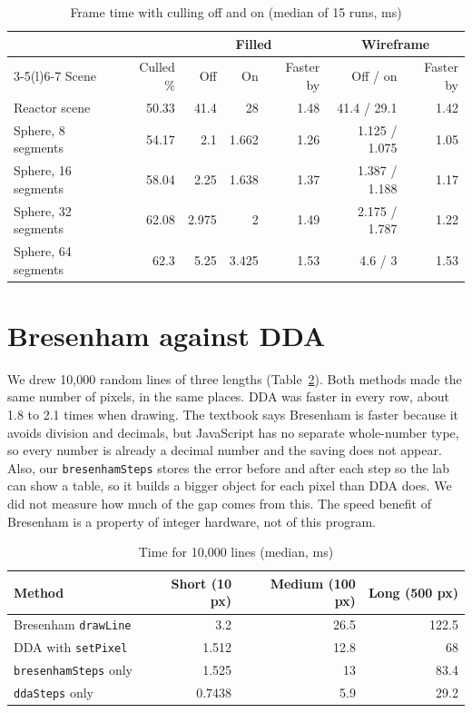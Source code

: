 \begin{table}[H]
\centering
\caption{Frame time with culling off and on (median of 15 runs, ms)}
\label{tab:cull}
\small
\begin{tabular}{@{}lrrrrrr@{}}
\toprule
 & & \multicolumn{3}{c}{Filled} & \multicolumn{2}{c}{Wireframe}\\
\cmidrule(lr){3-5}\cmidrule(l){6-7}
Scene & Culled \% & Off & On & Faster by & Off / on & Faster by\\
\midrule
Reactor scene & 50.33 & 41.4 & 28 & 1.48 & 41.4 / 29.1 & 1.42\\
Sphere, 8 segments & 54.17 & 2.1 & 1.662 & 1.26 & 1.125 / 1.075 & 1.05\\
Sphere, 16 segments & 58.04 & 2.25 & 1.638 & 1.37 & 1.387 / 1.188 & 1.17\\
Sphere, 32 segments & 62.08 & 2.975 & 2 & 1.49 & 2.175 / 1.787 & 1.22\\
Sphere, 64 segments & 62.3 & 5.25 & 3.425 & 1.53 & 4.6 / 3 & 1.53\\
\bottomrule
\end{tabular}
\end{table}

\section{Bresenham against DDA}
We drew 10,000 random lines of three lengths (Table~\ref{tab:line}). Both methods made the same number of pixels, in the same places. DDA was faster in every row, about 1.8 to 2.1 times when drawing. The textbook says Bresenham is faster because it avoids division and decimals, but JavaScript has no separate whole-number type, so every number is already a decimal number and the saving does not appear. Also, our \texttt{bresenhamSteps} stores the error before and after each step so the lab can show a table, so it builds a bigger object for each pixel than DDA does. We did not measure how much of the gap comes from this. The speed benefit of Bresenham is a property of integer hardware, not of this program.

\begin{table}[H]
\centering
\caption{Time for 10,000 lines (median, ms)}
\label{tab:line}
\small
\begin{tabular}{@{}lrrr@{}}
\toprule
Method & Short (10 px) & Medium (100 px) & Long (500 px)\\
\midrule
Bresenham \texttt{drawLine} & 3.2 & 26.5 & 122.5\\
DDA with \texttt{setPixel} & 1.512 & 12.8 & 68\\
\texttt{bresenhamSteps} only & 1.525 & 13 & 83.4\\
\texttt{ddaSteps} only & 0.7438 & 5.9 & 29.2\\
\bottomrule
\end{tabular}
\end{table}


